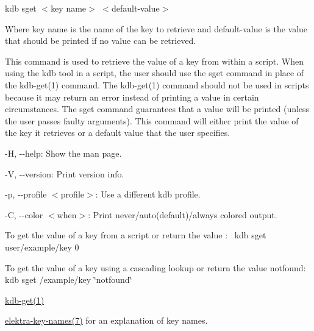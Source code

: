 {\ttfamily kdb sget $<$key name$>$ $<$default-\/value$>$}

Where {\ttfamily key name} is the name of the key to retrieve and {\ttfamily default-\/value} is the value that should be printed if no value can be retrieved.

This command is used to retrieve the value of a key from within a script. When using the kdb tool in a script, the user should use the {\ttfamily sget} command in place of the kdb-\/get(1) command. The kdb-\/get(1) command should not be used in scripts because it may return an error instead of printing a value in certain circumstances. The {\ttfamily sget} command guarantees that a value will be printed (unless the user passes faulty arguments). This command will either print the value of the key it retrieves or a default value that the user specifies.


\begin{DoxyItemize}
\item {\ttfamily -\/H}, {\ttfamily -\/-\/help}\+: Show the man page.
\item {\ttfamily -\/V}, {\ttfamily -\/-\/version}\+: Print version info.
\item {\ttfamily -\/p}, {\ttfamily -\/-\/profile $<$profile$>$}\+: Use a different kdb profile.
\item {\ttfamily -\/C}, {\ttfamily -\/-\/color $<$when$>$}\+: Print never/auto(default)/always colored output.
\end{DoxyItemize}

To get the value of a key from a script or return the value {}\+:~\newline
 {\ttfamily kdb sget user/example/key 0}

To get the value of a key using a cascading lookup or return the value {\ttfamily notfound}\+:~\newline
 {\ttfamily kdb sget /example/key \char`\"{}notfound\char`\"{}}


\begin{DoxyItemize}
\item \hyperlink{doc_help_kdb-get_md}{kdb-\/get(1)}
\item \hyperlink{doc_help_elektra-key-names_md}{elektra-\/key-\/names(7)} for an explanation of key names. 
\end{DoxyItemize}